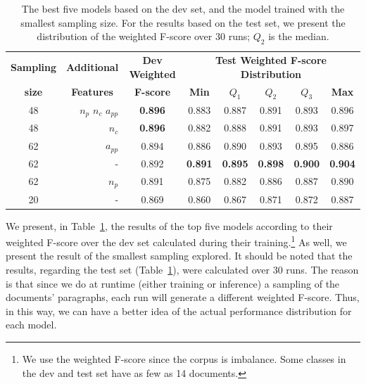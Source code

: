 \documentclass[11pt]{article}
\begin{document}
\begin{table}[t]
	\centering
	\caption{The best five models based on the dev set, and the model trained with the smallest sampling size.
	 For the results based on the test set, we present the distribution of the weighted F-score over 30 runs; $Q_2$ is the median.}
	\label{table:results}
		\begin{tabular}{crcccccc}
			\toprule
			\multicolumn{1}{c}{\textbf{Sampling}} 	& \multicolumn{1}{c}{\textbf{Additional}} 	& \textbf{Dev Weighted}	& \multicolumn{5}{c}{\textbf{Test Weighted F-score Distribution}} \\
			\multicolumn{1}{c}{\textbf{size}} 		& \multicolumn{1}{c}{\textbf{Features}} 	& \textbf{F-score}		& \textbf{Min}		& $Q_1$ 			& $Q_2$ 			& $Q_3$ 			& \textbf{Max} \\
			\midrule
			48 										& $n_p$ $n_c$ $a_{pp}$ 						& \textbf{0.896} 		& 0.883 			& 0.887 			& 0.891 			& 0.893 			& 0.896\\
			48 										& $n_c$ 									& \textbf{0.896} 		& 0.882 			& 0.888 			& 0.891 			& 0.893 			& 0.897\\
			62 										& $a_{pp}$ 									& 0.894 				& 0.886 			& 0.890 			& 0.893 			& 0.895 			& 0.886\\
			62 										& - 										& 0.892 				& \textbf{0.891} 	& \textbf{0.895} 	& \textbf{0.898} 	& \textbf{0.900} 	& \textbf{0.904}\\
			62 										& $n_p$ 									& 0.891 				& 0.875 			& 0.882 			& 0.886 			& 0.887 			& 0.890\\
			\midrule
			20 										& - 										& 0.869 				& 0.860 			& 0.867 			& 0.871 			& 0.872 				& 0.887\\
			\bottomrule
		\end{tabular}
\end{table}


    We present, in Table~\ref{table:results}, the results of the top five models according to their weighted F-score over the dev set calculated during their training.\footnote{We use the weighted F-score since the corpus is imbalance. Some classes in the dev and test set have as few as 14 documents.} As well, we present the result of the smallest sampling explored. It should be noted that the results, regarding the test set (Table~\ref{table:results}), were calculated over 30 runs. The reason is that since we do at runtime (either training or inference) a sampling of the documents' paragraphs, each run will generate a different weighted F-score. Thus, in this way, we can have a better idea of the actual performance distribution for each model.
\end{document}
